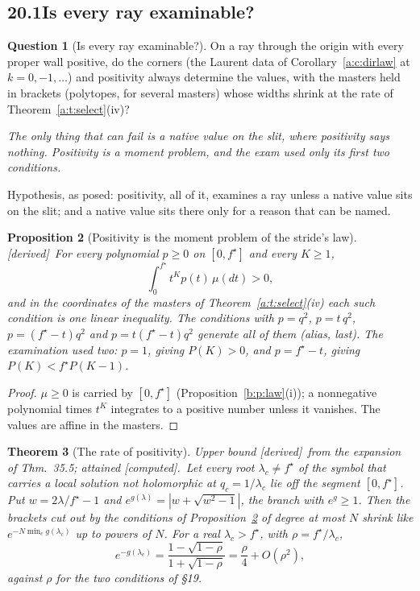 \documentclass[11pt]{article}
\theoremstyle{plain}
\newtheorem{proposition}{Proposition}[section]
\newtheorem{theorem}[proposition]{Theorem}
\theoremstyle{definition}
\newtheorem{question}[proposition]{Question}
\theoremstyle{remark}
\newcommand{\derived}{\textup{[derived]}}
\newcommand{\computed}{\textup{[computed]}}
\begin{document}
\subsection*{20.1\quad Is every ray examinable?}

\begin{question}[Is every ray examinable?]\label{a:q:exam}
On a ray through the origin with every proper wall positive, do the corners (the Laurent data of Corollary~\ref{a:c:dirlaw} at $k=0,-1,\dots$) and positivity always determine the values, with the masters held in brackets (polytopes, for several masters) whose widths shrink at the rate of Theorem~\ref{a:t:select}(iv)?
\end{question}

\emph{The only thing that can fail is a native value on the slit, where positivity says nothing. Positivity is a moment problem, and the exam used only its first two conditions.}

Hypothesis, as posed: positivity, all of it, examines a ray unless a native value sits on the slit; and a native value sits there only for a reason that can be named.

\begin{proposition}[Positivity is the moment problem of the stride's law]\label{b:p:moment}\derived\
For every polynomial $p\ge0$ on $[0,f^\star]$ and every $K\ge1$,
\[
\int_0^{f^\star}t^Kp(t)\,\mu(dt)>0 ,
\]
and in the coordinates of the masters of Theorem~\ref{a:t:select}(iv) each such condition is one linear inequality. The conditions with $p=q^2$, $p=t\,q^2$, $p=(f^\star-t)q^2$ and $p=t(f^\star-t)q^2$ generate all of them (alias, last). The examination used two: $p=1$, giving $P(K)>0$, and $p=f^\star-t$, giving $P(K)<f^\star P(K-1)$.
\end{proposition}

\begin{proof}
$\mu\ge0$ is carried by $[0,f^\star]$ (Proposition~\ref{b:p:law}(i)); a nonnegative polynomial times $t^K$ integrates to a positive number unless it vanishes. The values are affine in the masters.
\end{proof}

\begin{theorem}[The rate of positivity]\label{b:t:rate}Upper bound \derived\ from the expansion of Thm.~35.5; attained \computed.\
Let every root $\lambda_c\neq f^\star$ of the symbol that carries a local solution not holomorphic at $q_c=1/\lambda_c$ lie off the segment $[0,f^\star]$. Put $w=2\lambda/f^\star-1$ and $e^{g(\lambda)}=|w+\sqrt{w^2-1}|$, the branch with $e^{g}\ge1$. Then the brackets cut out by the conditions of Proposition~\ref{b:p:moment} of degree at most $N$ shrink like $e^{-N\min_cg(\lambda_c)}$ up to powers of $N$. For a real $\lambda_c>f^\star$, with $\rho=f^\star/\lambda_c$,
\[
e^{-g(\lambda_c)}=\frac{1-\sqrt{1-\rho}}{1+\sqrt{1-\rho}}=\frac\rho4+O(\rho^2),
\]
against $\rho$ for the two conditions of \S19.
\end{theorem}
\end{document}
